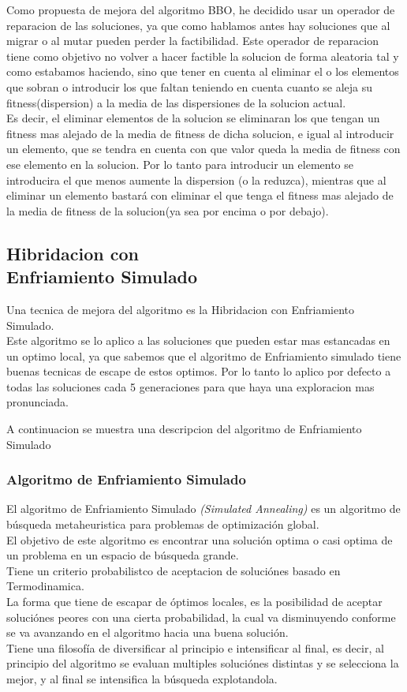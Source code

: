 \documentclass{article}
\begin{document}
Como propuesta de mejora del algoritmo BBO, he decidido usar un operador de reparacion de las soluciones, ya que como hablamos antes hay soluciones
que al migrar o al mutar pueden perder la factibilidad. Este operador de reparacion tiene como objetivo no volver a hacer factible la solucion de forma aleatoria tal y como estabamos haciendo,
sino que tener en cuenta al eliminar el o los elementos que sobran o introducir los que faltan teniendo en cuenta cuanto se aleja su fitness(dispersion) a la media de las dispersiones 
de la solucion actual.\\
Es decir, el eliminar elementos de la solucion se eliminaran los que tengan un fitness mas alejado de la media de fitness de dicha solucion, e igual al introducir un elemento, que se tendra en cuenta 
con que valor queda la media de fitness con ese elemento en la solucion. Por lo tanto para introducir un elemento se introducira el que menos aumente la dispersion (o la reduzca), mientras que al eliminar un 
elemento bastará con eliminar el que tenga el fitness mas alejado de la media de fitness de la solucion(ya sea por encima o por debajo). 

\subsection{\normalsize Hibridacion con \\Enfriamiento Simulado}

Una tecnica de mejora del algoritmo es la Hibridacion con Enfriamiento Simulado.\\
Este algoritmo se lo aplico a las soluciones que pueden estar mas estancadas en un optimo local, ya que sabemos que el algoritmo de Enfriamiento simulado tiene 
buenas tecnicas de escape de estos optimos. Por lo tanto lo aplico por defecto a todas las soluciones cada 5 generaciones para que haya una exploracion mas pronunciada.

A continuacion se muestra una descripcion del algoritmo de Enfriamiento Simulado
\subsubsection{\scriptsize Algoritmo de Enfriamiento Simulado}
El algoritmo de Enfriamiento Simulado \emph{(Simulated Annealing)} es un algoritmo de búsqueda metaheuristica
para problemas de optimización global.\\
El objetivo de este algoritmo es encontrar una solución optima o casi optima de un problema en un espacio
de búsqueda grande.\\
Tiene un criterio probabilistco de aceptacion de soluciónes basado en Termodinamica.\\
La forma que tiene de escapar de óptimos locales, es la posibilidad de aceptar soluciónes peores con una cierta probabilidad,
la cual va disminuyendo conforme se va avanzando en el algoritmo hacia una buena solución.\\
Tiene una filosofía de diversificar al principio e intensificar al final, es decir, al principio del algoritmo
se evaluan multiples soluciónes distintas y se selecciona la mejor, y al final se intensifica la búsqueda
explotandola.
\vspace{5mm}
\end{document}
